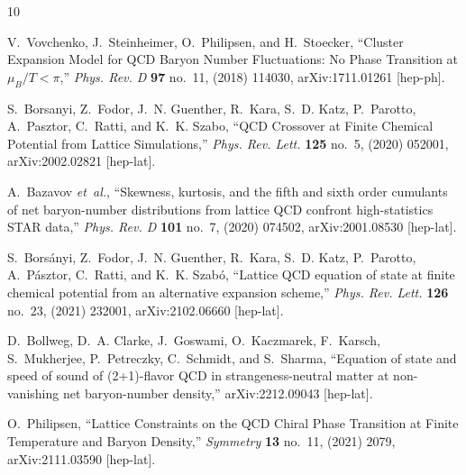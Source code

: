 \documentclass[a4paper,12pt]{article}
\numberwithin{equation}{section}
\begin{document}
\providecommand{\href}[2]{#2}\begingroup\raggedright\begin{thebibliography}{10}
	
	V.~Vovchenko, J.~Steinheimer, O.~Philipsen, and H.~Stoecker, ``{Cluster
		Expansion Model for QCD Baryon Number Fluctuations: No Phase Transition at
		$\mu_B / T < \pi$},''
	\href{http://dx.doi.org/10.1103/PhysRevD.97.114030}{{\em Phys. Rev. D}
		{\bfseries 97} no.~11, (2018) 114030},
	\href{http://arxiv.org/abs/1711.01261}{{\ttfamily arXiv:1711.01261
			[hep-ph]}}.
	
	S.~Borsanyi, Z.~Fodor, J.~N. Guenther, R.~Kara, S.~D. Katz, P.~Parotto,
	A.~Pasztor, C.~Ratti, and K.~K. Szabo, ``{QCD Crossover at Finite Chemical
		Potential from Lattice Simulations},''
	\href{http://dx.doi.org/10.1103/PhysRevLett.125.052001}{{\em Phys. Rev.
			Lett.} {\bfseries 125} no.~5, (2020) 052001},
	\href{http://arxiv.org/abs/2002.02821}{{\ttfamily arXiv:2002.02821
			[hep-lat]}}.
	
	A.~Bazavov {\em et~al.}, ``{Skewness, kurtosis, and the fifth and sixth order
		cumulants of net baryon-number distributions from lattice QCD confront
		high-statistics STAR data},''
	\href{http://dx.doi.org/10.1103/PhysRevD.101.074502}{{\em Phys. Rev. D}
		{\bfseries 101} no.~7, (2020) 074502},
	\href{http://arxiv.org/abs/2001.08530}{{\ttfamily arXiv:2001.08530
			[hep-lat]}}.
	
	S.~Bors\'anyi, Z.~Fodor, J.~N. Guenther, R.~Kara, S.~D. Katz, P.~Parotto,
	A.~P\'asztor, C.~Ratti, and K.~K. Szab\'o, ``{Lattice QCD equation of state
		at finite chemical potential from an alternative expansion scheme},''
	\href{http://dx.doi.org/10.1103/PhysRevLett.126.232001}{{\em Phys. Rev.
			Lett.} {\bfseries 126} no.~23, (2021) 232001},
	\href{http://arxiv.org/abs/2102.06660}{{\ttfamily arXiv:2102.06660
			[hep-lat]}}.
	
	D.~Bollweg, D.~A. Clarke, J.~Goswami, O.~Kaczmarek, F.~Karsch, S.~Mukherjee,
	P.~Petreczky, C.~Schmidt, and S.~Sharma, ``{Equation of state and speed of
		sound of (2+1)-flavor QCD in strangeness-neutral matter at non-vanishing net
		baryon-number density},'' \href{http://arxiv.org/abs/2212.09043}{{\ttfamily
			arXiv:2212.09043 [hep-lat]}}.
	
	O.~Philipsen, ``{Lattice Constraints on the QCD Chiral Phase Transition at
		Finite Temperature and Baryon Density},''
	\href{http://dx.doi.org/10.3390/sym13112079}{{\em Symmetry} {\bfseries 13}
		no.~11, (2021) 2079}, \href{http://arxiv.org/abs/2111.03590}{{\ttfamily
			arXiv:2111.03590 [hep-lat]}}.
	

\end{thebibliography}
\end{document}
